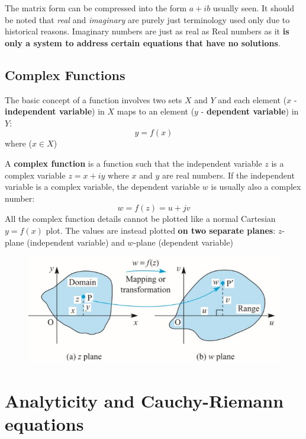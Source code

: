 \documentclass[10pt,a4paper]{article}
\begin{document}
The matrix form can be compressed into the form $a+ib$ usually seen. It should be noted
that \textit{real} and \textit{imaginary} are purely just terminology used only due to historical
reasons. Imaginary numbers are just as real as Real numbers as it \textbf{is only a system to
address certain equations that have no solutions}.

\subsection{Complex Functions}

The basic concept of a function involves two sets $X$ and $Y$ and each element ($x$ - \textbf{independent
variable}) in $X$ maps to an element ($y$ - \textbf{dependent variable})
in $Y$: $$y=f(x)$$ where ($x\in X$) \par 

A \textbf{complex function} is a function such that the independent variable $z$ is a complex variable $z=x+iy$ where $x$ and
$y$ are real numbers. If the independent variable is a complex variable, the dependent variable $w$ is
usually also a complex number: 
$$w=f(z)=u+jv$$
All the complex function details cannot be plotted like a normal Cartesian $y=f(x)$ plot. The values
are instead plotted \textbf{on two separate planes}: $z$-plane (independent variable) and $w$-plane (dependent variable)
\begin{figure} [h!]
    \centering
    \includegraphics[scale=0.5]{Z-plane}
\end{figure}

\pagebreak

\section{Analyticity and Cauchy-Riemann equations}
\end{document}
